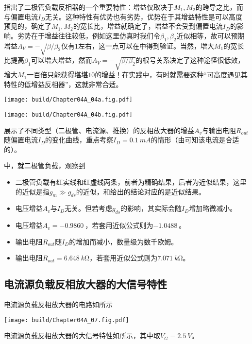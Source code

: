 指出了二极管负载反相器的一个重要特性：增益仅取决于$M_1,M_2$的跨导之比，而与偏置电流$I_D$无关。这种特性有优势也有劣势，优势在于其增益特性是可以高度预见的，确定了$M_1,M_2$的宽长比，增益就确定了，增益不会受到偏置电流$I_D$的影响。劣势在于增益往往较低，例如这里仿真时我们令$\beta_1,\beta_2$近似相等，故可以预期增益$A_V=-\sqrt{\beta/\beta_2}$仅有$1$左右，这一点可以在中得到验证。当然，增大$M_1$的宽长比提高$\beta_1$可以增大增益，然而$A_V=-\sqrt{\beta/\beta_2}$的根号关系决定了这种途径很低效，增大$M_1$一百倍只能获得堪堪$10$的增益！在实践中，有时就需要这种“可高度遇见其特性的低增益反相器”，这就非常合适。

\begin{Figure}[反相放大器的特性与偏置的关系]
    \begin{FigureSub}
        \texttt{[image: build/Chapter04A\_04a.fig.pdf]}
    \end{FigureSub}
    \begin{FigureSub}
        \texttt{[image: build/Chapter04A\_04b.fig.pdf]}
    \end{FigureSub}
\end{Figure}

展示了不同类型（二极管、电流源、推挽）的反相放大器的增益$A_v$与输出电阻$R_{out}$随偏置电流$I_D$的变化曲线，重点考察$I_D=\SI{0.1}{mA}$的情形（由可知该电流是合适的）。

中，就二极管负载，观察到
\begin{itemize}
    \item 二极管负载有红实线和红虚线两条，前者为精确结果，后者为近似结果，这里的近似是指$g_{m}\gg g_{ds}$的近似，和给出的结论对应的是近似结果。
    \item 电压增益$A_v$与$I_D$无关。但若考虑$g_{ds}$的影响，其实际会随$I_D$增加略微减小。
    \item 电压增益$A_v=\SI{-0.9860}{}$，若套用近似公式则为$\SI{-1.0488}{}$。
    \item 输出电阻$R_{out}$随$I_D$的增加而减小，数量级为数千欧姆。
    \item 输出电阻$R_{out}=\SI{6.648}{k\ohm}$，若套用近似公式则为$\SI{7.071}{k\ohm}$。
\end{itemize}

\subsection{电流源负载反相放大器的大信号特性}
电流源负载反相放大器的电路如所示
\begin{Figure}[电流源负载反相放大器]
    \texttt{[image: build/Chapter04A\_07.fig.pdf]}
\end{Figure}
电流源负载反相放大器的大信号特性如所示，其中取$V_G=\SI{2.5}{V}$。

